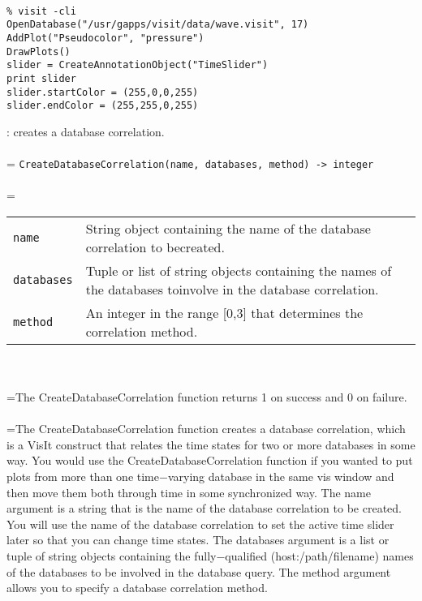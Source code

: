\documentclass[10pt,a4paper]{report}
\begin{document}
\\[-6mm]
\begin{verbatim}% visit -cli
OpenDatabase("/usr/gapps/visit/data/wave.visit", 17)
AddPlot("Pseudocolor", "pressure")
DrawPlots()
slider = CreateAnnotationObject("TimeSlider")
print slider
slider.startColor = (255,0,0,255)
slider.endColor = (255,255,0,255)
\end{verbatim}
\newpage


{}
: creates a database correlation.\\[-3mm]

 \\ 
\hangindent=\parindent 
\verb!CreateDatabaseCorrelation(name, databases, method) -> integer!\\ [-3mm]

 \\ 
\hangindent=\parindent 
\begin{tabular}{lp{9cm}}
\verb!name! & String object containing the name of the database correlation to becreated. \\
\verb!databases! & Tuple or list of string objects containing the names of the databases toinvolve in the database correlation. \\
\verb!method! & An integer in the range [0,3] that determines the correlation method. \\
\end{tabular} \\[-2mm]


 \\ 
\hangindent=\parindent The CreateDatabaseCorrelation function returns 1 on success and 0 on failure. \\[-3mm] 

 \\ 
\hangindent=\parindent The CreateDatabaseCorrelation function creates a database correlation, which is a VisIt construct that relates the time states for two or more databases in some way. You would use the CreateDatabaseCorrelation function if you wanted to put plots from more than one time$-$varying database in the same vis window and then move them both through time in some synchronized way. The name argument is a string that is the name of the database correlation to be created. You will use the name of the database correlation to set the active time slider later so that you can change time states. The databases argument is a list or tuple of string objects containing the fully$-$qualified (host:/path/filename) names of the databases to be involved in the database query. The method argument allows you to specify a database correlation method. \\
\end{document}
